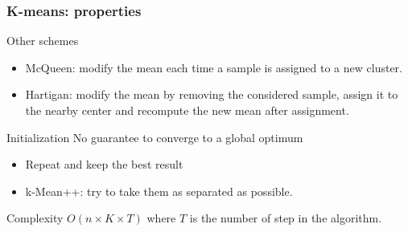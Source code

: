 \documentclass{beamer}\usepackage[]{graphicx}\usepackage[]{color}
\begin{document}
\begin{frame}
\frametitle{K-means: properties}
  
  \begin{block}{Other schemes}
    \begin{itemize}
      \item \alert{McQueen}: modify the mean each time a sample is assigned to a new cluster.
      \item \alert{Hartigan}: modify the mean by removing the considered sample, assign it to the nearby center and recompute the new mean after assignment.
    \end{itemize}
  \end{block}
  
  \begin{block}{Initialization}
    No guarantee to converge to a global optimum
    \begin{itemize}
      \item Repeat and keep the best result
      \item k-Mean++: try to take them as separated as possible.
    \end{itemize}
  \end{block}

  \begin{block}{Complexity}
     $O(n \times K \times T)$ where $T$ is the number of step in the algorithm.
  \end{block}
  
\end{frame}
\end{document}
